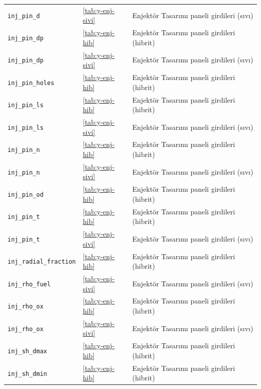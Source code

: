 \documentclass[11pt,a4paper]{article}
\begin{document}
{\begin{longtable}{@{}>{\raggedright\arraybackslash}p{5.2cm}p{1.4cm}>{\raggedright\arraybackslash}p{7.4cm}@{}}
\texttt{inj\_\allowbreak{}pin\_\allowbreak{}d} & \ref{tab:y-enj-sivi} & Enjektör Tasarımı paneli girdileri (sıvı) \\
\texttt{inj\_\allowbreak{}pin\_\allowbreak{}dp} & \ref{tab:y-enj-hib} & Enjektör Tasarımı paneli girdileri (hibrit) \\
\texttt{inj\_\allowbreak{}pin\_\allowbreak{}dp} & \ref{tab:y-enj-sivi} & Enjektör Tasarımı paneli girdileri (sıvı) \\
\texttt{inj\_\allowbreak{}pin\_\allowbreak{}holes} & \ref{tab:y-enj-hib} & Enjektör Tasarımı paneli girdileri (hibrit) \\
\texttt{inj\_\allowbreak{}pin\_\allowbreak{}ls} & \ref{tab:y-enj-hib} & Enjektör Tasarımı paneli girdileri (hibrit) \\
\texttt{inj\_\allowbreak{}pin\_\allowbreak{}ls} & \ref{tab:y-enj-sivi} & Enjektör Tasarımı paneli girdileri (sıvı) \\
\texttt{inj\_\allowbreak{}pin\_\allowbreak{}n} & \ref{tab:y-enj-hib} & Enjektör Tasarımı paneli girdileri (hibrit) \\
\texttt{inj\_\allowbreak{}pin\_\allowbreak{}n} & \ref{tab:y-enj-sivi} & Enjektör Tasarımı paneli girdileri (sıvı) \\
\texttt{inj\_\allowbreak{}pin\_\allowbreak{}od} & \ref{tab:y-enj-hib} & Enjektör Tasarımı paneli girdileri (hibrit) \\
\texttt{inj\_\allowbreak{}pin\_\allowbreak{}t} & \ref{tab:y-enj-hib} & Enjektör Tasarımı paneli girdileri (hibrit) \\
\texttt{inj\_\allowbreak{}pin\_\allowbreak{}t} & \ref{tab:y-enj-sivi} & Enjektör Tasarımı paneli girdileri (sıvı) \\
\texttt{inj\_\allowbreak{}radial\_\allowbreak{}fraction} & \ref{tab:y-enj-hib} & Enjektör Tasarımı paneli girdileri (hibrit) \\
\texttt{inj\_\allowbreak{}rho\_\allowbreak{}fuel} & \ref{tab:y-enj-sivi} & Enjektör Tasarımı paneli girdileri (sıvı) \\
\texttt{inj\_\allowbreak{}rho\_\allowbreak{}ox} & \ref{tab:y-enj-hib} & Enjektör Tasarımı paneli girdileri (hibrit) \\
\texttt{inj\_\allowbreak{}rho\_\allowbreak{}ox} & \ref{tab:y-enj-sivi} & Enjektör Tasarımı paneli girdileri (sıvı) \\
\texttt{inj\_\allowbreak{}sh\_\allowbreak{}dmax} & \ref{tab:y-enj-hib} & Enjektör Tasarımı paneli girdileri (hibrit) \\
\texttt{inj\_\allowbreak{}sh\_\allowbreak{}dmin} & \ref{tab:y-enj-hib} & Enjektör Tasarımı paneli girdileri (hibrit) \\

\end{longtable}}
\end{document}
